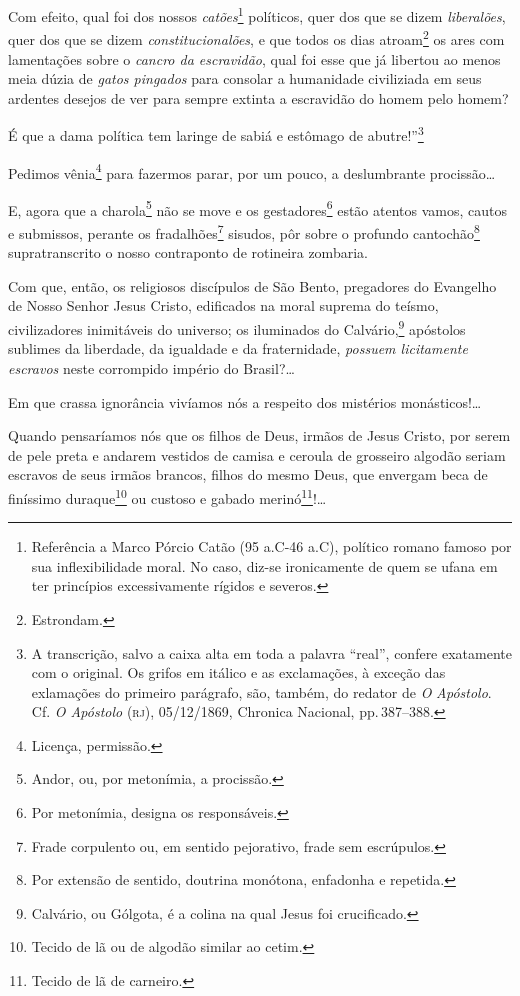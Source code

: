 Com efeito, qual foi dos nossos \emph{catões}\footnote{ Referência a
  Marco Pórcio Catão (95 a.C-46 a.C), político romano famoso por sua
  inflexibilidade moral. No caso, diz-se ironicamente de quem se ufana
  em ter princípios excessivamente rígidos e severos.} políticos, quer
dos que se dizem \emph{liberalões}, quer dos que se dizem
\emph{constitucionalões}, e que todos os dias atroam\footnote{
  Estrondam.} os ares com lamentações sobre o \emph{cancro da
escravidão}, qual foi esse que já libertou ao menos meia dúzia de
\emph{gatos pingados} para consolar a humanidade civiliziada em seus
ardentes desejos de ver para sempre extinta a escravidão do homem pelo
homem?

É que a dama política tem laringe de sabiá e estômago de
abutre!''\footnote{ A transcrição, salvo a caixa alta em toda a palavra
  ``real'', confere exatamente com o original. Os grifos em itálico e as
  exclamações, à exceção das exlamações do primeiro parágrafo, são,
  também, do redator de \emph{O} \emph{Apóstolo}. Cf. \emph{O Apóstolo}
  (\textsc{rj}), 05/12/1869, Chronica Nacional, pp.\,387--388.}

Pedimos vênia\footnote{ Licença, permissão.} para fazermos parar, por
um pouco, a deslumbrante procissão\ldots{}

E, agora que a charola\footnote{ Andor, ou, por metonímia, a procissão.}
não se move e os gestadores\footnote{ Por metonímia, designa os
  responsáveis.} estão atentos vamos, cautos e submissos, perante os
fradalhões\footnote{ Frade corpulento ou, em sentido pejorativo, frade
  sem escrúpulos.} sisudos, pôr sobre o profundo cantochão\footnote{
  Por extensão de sentido, doutrina monótona, enfadonha e repetida.}
supratranscrito o nosso contraponto de rotineira zombaria.

Com que, então, os religiosos discípulos de São Bento, pregadores do
Evangelho de Nosso Senhor Jesus Cristo, edificados na moral suprema do
teísmo, civilizadores inimitáveis do universo; os iluminados do
Calvário,\footnote{ Calvário, ou Gólgota, é a colina na qual Jesus foi
  crucificado.} apóstolos sublimes da liberdade, da igualdade e da
fraternidade, \emph{possuem licitamente escravos} neste corrompido
império do Brasil?\ldots{}

Em que crassa ignorância vivíamos nós a respeito dos mistérios
monásticos!\ldots{}

Quando pensaríamos nós que os filhos de Deus, irmãos de Jesus Cristo,
por serem de pele preta e andarem vestidos de camisa e ceroula de
grosseiro algodão seriam escravos de seus irmãos brancos, filhos do
mesmo Deus, que envergam beca de finíssimo duraque\footnote{ Tecido de
  lã ou de algodão similar ao cetim.} ou custoso e gabado
merinó\footnote{ Tecido de lã de carneiro.}!\ldots{}

